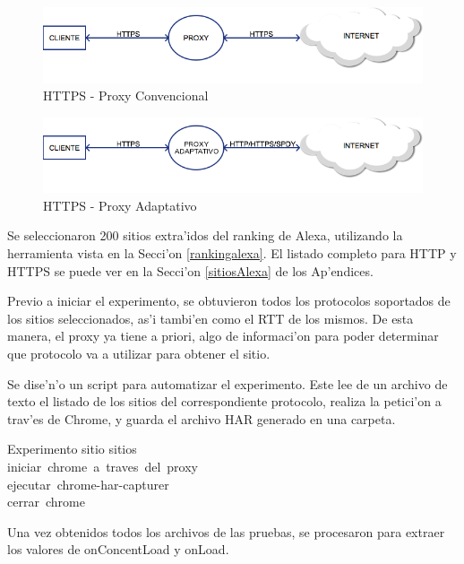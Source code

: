 \begin{figure}[h]
  	\centering
	\includegraphics[width=\textwidth]{img/httpsNormal}
	\caption{\small HTTPS - Proxy Convencional}
	\label{httpsNormal}
\end{figure}

\begin{figure}[h]
  	\centering
	\includegraphics[width=\textwidth]{img/httpsOptimizado}
	\caption{\small HTTPS - Proxy Adaptativo}
	\label{httpsOptimizado}
\end{figure}

Se seleccionaron 200 sitios extra'idos del ranking de Alexa, utilizando la herramienta vista en la Secci'on \ref{rankingalexa}. El listado completo para HTTP y HTTPS se puede ver en la Secci'on \ref{sitiosAlexa} de los Ap'endices.

Previo a iniciar el experimento, se obtuvieron todos los protocolos soportados de los sitios seleccionados, as'i tambi'en como el RTT de los mismos. De esta manera, el proxy ya tiene a priori, algo de informaci'on para poder determinar que protocolo va a utilizar para obtener el sitio.

Se dise'n'o un script para automatizar el experimento. Este lee de un archivo de texto el listado de los sitios del correspondiente protocolo, realiza la petici'on a trav'es de Chrome, y guarda el archivo HAR generado en una carpeta.

\begin{pseudocode}{Experimento}{ }
\BEGIN
	\FOR sitio \in sitios \DO \\
	\BEGIN
		iniciar\ chrome\ a\ traves\ del\ proxy\\
		ejecutar\ chrome-har-capturer\\
		cerrar\ chrome\\
	\END
\END
\end{pseudocode}

Una vez obtenidos todos los archivos de las pruebas, se procesaron para extraer los valores de onConcentLoad y onLoad. 


